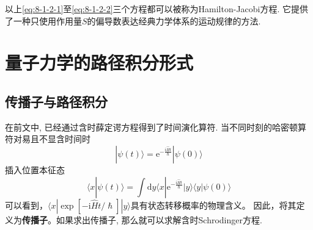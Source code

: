         以上\ref{eq:8-1-2-1}至\ref{eq:8-1-2-2}三个方程都可以被称为Hamilton-Jacobi方程. 它提供了一种只使用作用量$S$的偏导数表达经典力学体系的运动规律的方法.

    \section{量子力学的路径积分形式}

        \subsection{传播子与路径积分}

        在前文中, 已经通过含时薛定谔方程得到了时间演化算符. 当不同时刻的哈密顿算符对易且不显含时间时
        \begin{equation}
            | \psi(t) \rangle = \mathrm{e}^{-\frac {\mathrm{i}\hat{H}t}{\hslash}} | \psi(0) \rangle
        \end{equation}
        插入位置本征态
        \begin{equation}
            \langle x | \psi(t) \rangle = \int \mathrm{d} y \langle x | \mathrm{e}^{-\frac {\mathrm{i}\hat{H}t}{\hslash}} | y \rangle  \langle y | \psi(0) \rangle
        \end{equation}
        可以看到，$\langle x | \exp[-\mathrm{i}\hat{H}t / \hslash] | y \rangle$具有状态转移概率的物理含义。
        因此，将其定义为\textbf{传播子}。如果求出传播子, 那么就可以求解含时Schrodinger方程.

